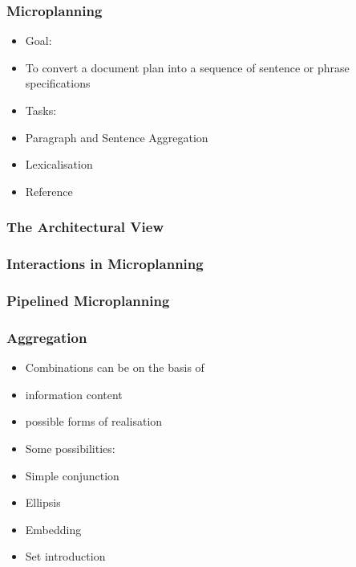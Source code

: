 \documentclass[compress,color=usenames]{beamer}
\begin{document}
\begin{frame}
\frametitle{Microplanning}

\label{f196}
\begin{itemize}
\item { {Goal: }}
\item { {To convert a document plan into a sequence of sentence or phrase specifications}}
\item { {Tasks:}}
\item { {Paragraph and Sentence Aggregation}}
\item { {Lexicalisation}}
\item { {Reference}}
\end{itemize}
 
\end{frame}

\begin{frame}
\frametitle{The Architectural View}

\label{f198}
 
\end{frame}

\begin{frame}
\frametitle{Interactions in Microplanning}

\label{f200}
 
\end{frame}

\begin{frame}
\frametitle{Pipelined Microplanning}

\label{f202}
 
\end{frame}

\begin{frame}
\frametitle{Aggregation}

\label{f204}
\begin{itemize}
\item { {Combinations can be on the basis of}}
\item { {information content}}
\item { {possible forms of realisation}}
\item { {Some possibilities:}}
\item { {Simple conjunction}}
\item { {Ellipsis}}
\item { {Embedding}}
\item { {Set introduction}}
\end{itemize}
 
\end{frame}
\end{document}
